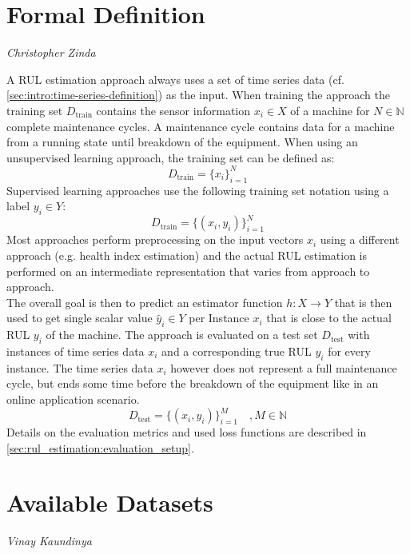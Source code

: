\section{Formal Definition}
\vspace*{-12.5mm}\hfill{\normalsize\emph{Christopher Zinda}}
\label{sec:rul_estimation:formal_definition}

A RUL estimation approach always uses a set of time series data (cf. \ref{sec:intro:time-series-definition}) as the input. When training the approach the training set $D_\text{train}$ contains the sensor information $x_i \in X$ of a machine for $N\in \mathbb{N}$ complete maintenance cycles. A maintenance cycle contains data for a machine from a running state until breakdown of the equipment. When using an unsupervised learning approach, the training set can be defined as:
\begin{equation} \label{eq:rul_train_set_unsupervised}
    D_\text{train} = \{x_i\}_{i=1}^N
\end{equation}
Supervised learning approaches use the following training set notation using a label $y_i \in Y$:
\begin{equation} \label{eq:rul_train_set_supervised}
    D_\text{train} = \{(x_i, y_i)\}_{i=1}^N
\end{equation}
Most approaches perform preprocessing on the input vectors $x_i$ using a different approach (e.g. health index estimation) and the actual RUL estimation is performed on an intermediate representation that varies from approach to approach.\\
The overall goal is then to predict an estimator function $h: X \rightarrow Y$ that is then used to get single scalar value $\hat{y}_i \in Y$ per Instance $x_i$ that is close to the actual RUL $y_i$ of the machine. The approach is evaluated on a test set $D_\text{test}$ with instances of time series data $x_i$ and a corresponding true RUL $y_i$ for every instance. The time series data $x_i$ however does not represent a full maintenance cycle, but ends some time before the breakdown of the equipment like in an online application scenario.
\begin{equation}
    D_\text{test} = \{(x_i, y_i)\}_{i=1}^M\quad, M \in \mathbb{N}
\end{equation}
Details on the evaluation metrics and used loss functions are described in \ref{sec:rul_estimation:evaluation_setup}.

\section{Available Datasets}
\vspace*{-12.5mm}\hfill{\normalsize\emph{Vinay Kaundinya}}
\label{sec:rul_estimation:datasets}

